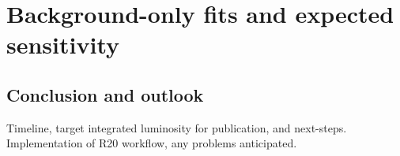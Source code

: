 \section{Background-only fits and expected sensitivity}
\label{sec:results}



\subsection{Conclusion and outlook}
Timeline, target integrated luminosity for publication, and next-steps.
Implementation of R20 workflow, any problems anticipated.
